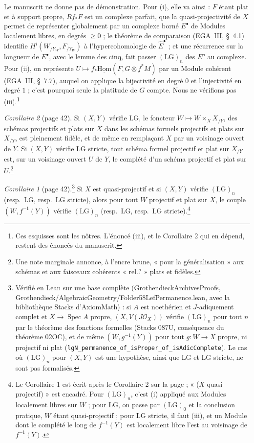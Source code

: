 \documentclass[11pt,a4paper]{article}
\begin{document}
Le manuscrit ne donne pas de démonstration. Pour (i), elle va ainsi : $F$
étant plat et à support propre, $Rf_*F$ est un complexe parfait, que la
quasi-projectivité de $X$ permet de représenter globalement par un complexe
borné $E^\bullet$ de Modules localement libres, en degrés $\geq 0$ ; le
théorème de comparaison (EGA~III, §~4.1) identifie $H^i(W_{/Y_W},
F_{/Y_W})$ à l'hypercohomologie de $\widehat{E}^\bullet$ ; et une récurrence
sur la longueur de $E^\bullet$, avec le lemme des cinq, fait passer
$(\mathrm{LG})_n$ des $E^p$ au complexe. Pour (ii), on représente
$U \mapsto f_* \underline{\mathrm{Hom}}(F, G \otimes f^* M)$ par un Module
cohérent (EGA~III, §~7.7), auquel on applique la bijectivité en degré $0$ et
l'injectivité en degré $1$ ; c'est pourquoi seule la platitude de $G$ compte.
Nous ne vérifions pas (iii).\footnote{Ces esquisses sont les nôtres. L'énoncé
(iii), et le Corollaire 2 qui en dépend, restent des énoncés du manuscrit.}

\emph{Corollaire 2} (page 42). Si $(X, Y)$ vérifie LG, le foncteur
$W \mapsto W \times_X X_{/Y}$, des schémas projectifs et plats sur $X$ dans
les schémas formels projectifs et plats sur $X_{/Y}$, est pleinement fidèle,
et de même en remplaçant $X$ par un voisinage ouvert de $Y$. Si $(X, Y)$
vérifie LG stricte, tout schéma formel projectif et plat sur $X_{/Y}$ est, sur
un voisinage ouvert $U$ de $Y$, le complété d'un schéma projectif et plat sur
$U$.\footnote{Une note marginale annonce, à l'encre brune, « pour la
généralisation » aux schémas et aux faisceaux cohérents « rel.? » plats et
fidèles.}

\emph{Corollaire 1} (page 42).\footnote{Vérifié en Lean sur une base complète
(GrothendieckArchivesProofs, Grothendieck/AlgebraicGeometry/Folder58LefPermanence.lean, avec la bibliothèque Stacks d'AxiomMath) :
si $A$ est noethérien et $J$-adiquement complet et $X \to \operatorname{Spec} A$
propre, $(X, V(J\mathcal{O}_X))$ vérifie $(\mathrm{LG})_n$ pour tout $n$ par le
théorème des fonctions formelles (Stacks 087U, conséquence du théorème 02OC), et de même $(W, g^{-1}(Y))$ pour
tout $g : W \to X$ propre, ni projectif ni plat
(\texttt{lgN\_permanence\_of\_isProper\_of\_isAdicComplete}). Le cas où
$(\mathrm{LG})_n$ pour $(X, Y)$ est une hypothèse, ainsi que LG et LG stricte, ne
sont pas formalisés.} Si $X$ est quasi-projectif et si $(X, Y)$
vérifie $(\mathrm{LG})_n$ (resp.\ LG, resp.\ LG stricte), alors pour tout
$W$ projectif et plat sur $X$, le couple $(W, f^{-1}(Y))$ vérifie
$(\mathrm{LG})_n$ (resp.\ LG, resp.\ LG stricte).\footnote{Le Corollaire 1 est
écrit après le Corollaire 2 sur la page ; « ($X$ quasi-projectif) » est
encadré. Pour $(\mathrm{LG})_n$, c'est (i) appliqué aux Modules localement
libres sur $W$ ; pour LG, on passe par $(\mathrm{LG})_0$ et la conclusion
pratique, $W$ étant quasi-projectif ; pour LG stricte, il faut (iii), et un
Module dont le complété le long de $f^{-1}(Y)$ est localement libre l'est au
voisinage de $f^{-1}(Y)$.}
\end{document}
